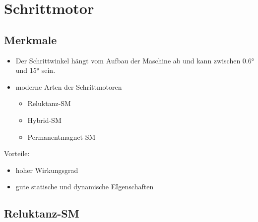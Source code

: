 \section{Schrittmotor}
    \subsection{Merkmale}
        \begin{itemize}
            \item Der Schrittwinkel hängt vom Aufbau der Maschine ab und kann zwischen 0.6° und 15° sein.
            \item moderne Arten der Schrittmotoren
            \begin{itemize}
                \item Reluktanz-SM
                \item Hybrid-SM
                \item Permanentmagnet-SM
            \end{itemize}
        \end{itemize}
        Vorteile:
        \begin{itemize}
            \item hoher Wirkungsgrad
            \item gute statische und dynamische EIgenschaften
        \end{itemize}
    
    \subsection{Reluktanz-SM}
    
   \clearpage
   \pagebreak     